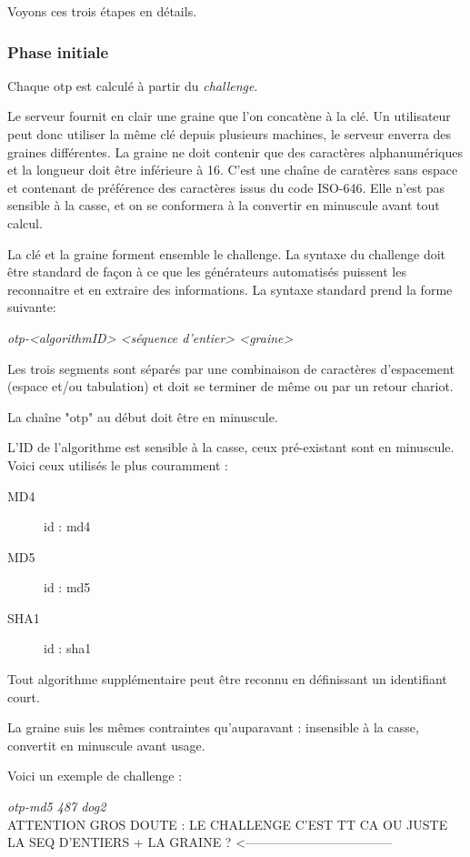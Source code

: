 \documentclass{../res/univ-projet}
\begin{document}
    Voyons ces trois étapes en détails.

    \subsubsection{Phase initiale}
      Chaque otp est calculé à partir du \emph{challenge}.

      Le serveur fournit en clair une graine que l'on concatène à la clé. Un utilisateur peut donc utiliser la même clé depuis plusieurs machines, le serveur enverra des graines différentes. La graine ne doit contenir que des caractères alphanumériques et la longueur doit être inférieure à 16. C'est une chaîne de caratères sans espace et contenant de préférence des caractères issus du code ISO-646. Elle n'est pas sensible à la casse, et on se conformera à la convertir en minuscule avant tout calcul.

      La clé et la graine forment ensemble le challenge. La syntaxe du challenge doit être standard de façon à ce que les générateurs automatisés puissent les reconnaitre et en extraire des informations. La syntaxe standard prend la forme suivante:
      \begin{center}
          \emph{otp-<algorithmID> <séquence d'entier> <graine>}\\
      \end{center}
      
      Les trois segments sont séparés par une combinaison de caractères d'espacement (espace et/ou tabulation) et doit se terminer de même ou par un retour chariot. 

      La chaîne "otp" au début doit être en minuscule.

      L'ID de l'algorithme est sensible à la casse, ceux pré-existant sont en minuscule. Voici ceux utilisés le plus couramment :
      \begin{description}
          \item [MD4] id : md4
          \item [MD5] id : md5
          \item [SHA1] id : sha1 
      \end{description}
      Tout algorithme supplémentaire peut être reconnu en définissant un identifiant court.

      La graine suis les mêmes contraintes qu'auparavant : insensible à la casse, convertit en minuscule avant usage.

      Voici un exemple de challenge :
      \begin{center}
          \emph{otp-md5 487 dog2 }\\    ATTENTION GROS DOUTE : LE CHALLENGE C'EST TT CA OU JUSTE LA SEQ D'ENTIERS + LA GRAINE ? <-----------------------------------
      \end{center}
\end{document}
